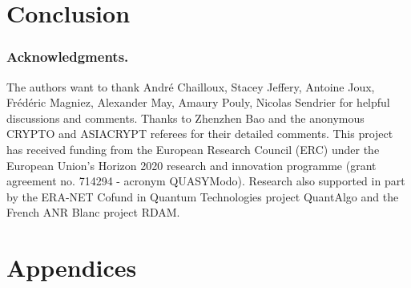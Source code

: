 \documentclass{llncs}
\newif\ifeprint
\begin{document}
\section{Conclusion}
\label{section:conclusion}




\subsubsection*{Acknowledgments.}
The authors want to thank André Chailloux, Stacey Jeffery, Antoine Joux, Frédéric Magniez, Alexander May, Amaury Pouly, Nicolas Sendrier for helpful discussions and comments. Thanks to Zhenzhen Bao and the anonymous CRYPTO and ASIACRYPT referees for their detailed comments. This project has received funding from the European Research Council (ERC) under the European Union’s Horizon 2020 research and innovation programme (grant agreement no. 714294 - acronym QUASYModo). Research also supported in part by the ERA-NET Cofund in Quantum Technologies project QuantAlgo and the French ANR Blanc project RDAM.





%




\newpage
\section*{\huge{Appendices}}
\appendix




%

%
%
\end{document}
